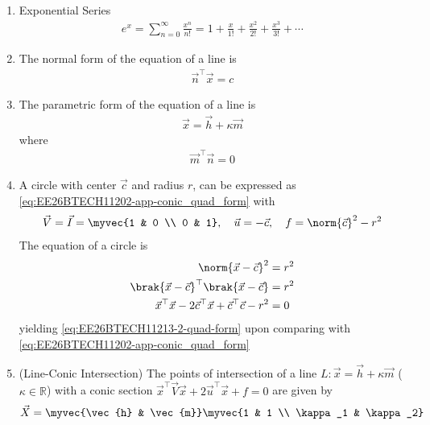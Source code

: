 \begin{enumerate}[label=\thesubsection.\arabic*, ref=\thesubsection.\theenumi,itemsep=0pt]

\item Exponential Series
\begin{align}
e^x = \sum_{n=0}^{\infty} \frac{x^n}{n!} = 1 + \frac{x}{1!} + \frac{x^2}{2!} + \frac{x^3}{3!} + \cdots \label{eq:EE26BTECH11213-exp_maclaurin}
\end{align}
\item The normal form of the equation of a line is 
\begin{align}
	\vec{n}^{\top}
\vec{x} = c
\label{eq:EE26BTECH11213-line-normal}
\end{align}
\item The parametric form of the equation of a line is 
\begin{align}
\vec{x} = \vec{h}+ \kappa \vec{m}
\label{eq:EE26BTECH11213-line-param}
\end{align}
where
\begin{align}
\vec{m}^\top \vec{n} = 0
\end{align}
\item A circle with center $\vec{c}$ and radius $r$, 
	can be expressed as
    \eqref{eq:EE26BTECH11202-app-conic_quad_form}
    with 
\begin{align}
\vec{V} = \vec{I} = \myvec{1 & 0 \\ 0 & 1}, \quad \vec{u} = -\vec{c}, \quad f = \norm{\vec{c}}^2 - r^2 
\label{eq:EE26BTECH11213-2-quad-form}
\end{align}
\solution  The equation of a circle is
\begin{align}
	\norm{\vec{x} - \vec{c}}^2 &= r^2
\\
\brak{\vec{x} - \vec{c}}^\top \brak{\vec{x} - \vec{c}} &= r^2 \\
\vec{x}^\top \vec{x} - 2\vec{c}^\top \vec{x} + \vec{c}^\top \vec{c} - r^2 &= 0
\end{align}
yielding \eqref{eq:EE26BTECH11213-2-quad-form}
upon comparing with 
    \eqref{eq:EE26BTECH11202-app-conic_quad_form}
\item (Line-Conic Intersection) The points of intersection of a line $L: \vec{x} = \vec{h} + \kappa \vec{m}$ ($\kappa \in \mathbb{R}$) with a conic section $\vec{x}^\top \vec{V} \vec{x} + 2\vec{u}^\top \vec{x} + f = 0$ are given by
\begin{align}
\vec{X} = \myvec{\vec{h} & \vec{m}} \myvec{1 & 1 \\ \kappa_1 & \kappa_2} \label{eq:EE26BTECH11213-conic_sol_matrix}

\end{align}
\end{enumerate}
